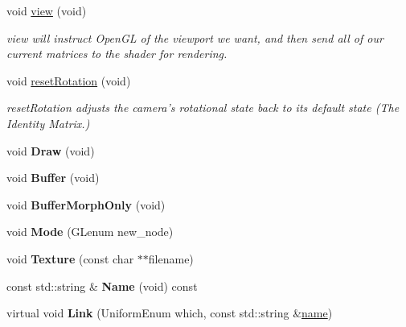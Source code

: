 \begin{DoxyCompactItemize}
void \hyperlink{class_camera_ae845a36306bba6b6e359cbdddce65f7f}{view} (void)
\begin{DoxyCompactList}\small\item\em view will instruct Open\-G\-L of the viewport we want, and then send all of our current matrices to the shader for rendering. \end{DoxyCompactList}\item 
void \hyperlink{class_camera_a8ec7938c5e25068e5bff25aeb7038af4}{reset\-Rotation} (void)
\begin{DoxyCompactList}\small\item\em reset\-Rotation adjusts the camera's rotational state back to its default state (The Identity Matrix.) \end{DoxyCompactList}\item 
\hypertarget{class_object_a3afa1b9af32b78d81b5de0836c511aeb}{void {\bfseries Draw} (void)}\label{class_object_a3afa1b9af32b78d81b5de0836c511aeb}

\item 
\hypertarget{class_object_a35c89a8eb8a5b742a9025331119bfc7c}{void {\bfseries Buffer} (void)}\label{class_object_a35c89a8eb8a5b742a9025331119bfc7c}

\item 
\hypertarget{class_object_a754f9f36a528f050b25d053ed43015f0}{void {\bfseries Buffer\-Morph\-Only} (void)}\label{class_object_a754f9f36a528f050b25d053ed43015f0}

\item 
\hypertarget{class_object_ac6ccf69d21c4c902c62829c48ef6cf5b}{void {\bfseries Mode} (G\-Lenum new\-\_\-node)}\label{class_object_ac6ccf69d21c4c902c62829c48ef6cf5b}

\item 
\hypertarget{class_object_aa104adfbcc2cae4bd68c053cc3dab721}{void {\bfseries Texture} (const char $\ast$$\ast$filename)}\label{class_object_aa104adfbcc2cae4bd68c053cc3dab721}

\item 
\hypertarget{class_object_a890760dff9df547454112ff84510040c}{const std\-::string \& {\bfseries Name} (void) const }\label{class_object_a890760dff9df547454112ff84510040c}

\item 
\hypertarget{class_object_accde5aa6e8d0d582719e94c414c2341c}{virtual void {\bfseries Link} (Uniform\-Enum which, const std\-::string \&\hyperlink{class_object_a24457e0a387492c80594aec7681a2277}{name})}\label{class_object_accde5aa6e8d0d582719e94c414c2341c}


\end{DoxyCompactItemize}
